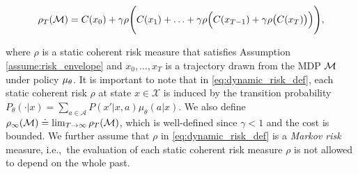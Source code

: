 \documentclass{article} %
\begin{document}

\vspace{-10pt}
\begin{small}
\begin{equation}\label{eq:dynamic_risk_def}
\rho_T(\mathcal{M}) = C(x_0) + \gamma\rho\Bigg(C(x_1) + \ldots +\gamma\rho\Big(C(x_{T-1}) + \gamma\rho\big(C(x_T)\big)\Big)\Bigg),
\end{equation}
\end{small}
\vspace{-0.15in}

where $\rho$ is a static coherent risk measure that satisfies Assumption \ref{assume:risk_envelope} and $x_0,\dots,x_T$ is a trajectory drawn from the MDP $\mathcal{M}$ under policy $\mu_{\theta}$. It is important to note that in \eqref{eq:dynamic_risk_def}, each static coherent risk $\rho$ at state $x\in\mathcal X$ is induced by the transition probability $P_\theta(\cdot|x)=\sum_{a\in\mathcal A}P(x'|x,a)\mu_\theta(a|x)$. We also define $\rho_\infty(\mathcal{M}) \doteq \lim_{T \to \infty}\rho_T(\mathcal{M})$, which is well-defined since $\gamma<1$ and the cost is bounded. We further assume that $\rho$ in \eqref{eq:dynamic_risk_def} is a \emph{Markov risk} measure, i.e.,~the evaluation of each static coherent risk measure $\rho$ is not allowed to depend on the whole past.
%
%
\end{document}
